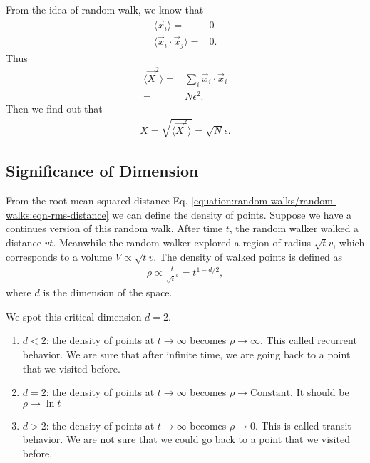 \documentclass[letterpaper,10pt,english]{sphinxmanual}
\begin{document}
From the idea of random walk, we know that
\begin{equation*}
\begin{split}\langle \vec x_i \rangle =& 0 \\
\langle \vec x_i \cdot \vec x_j \rangle =& 0.\end{split}
\end{equation*}
Thus
\begin{equation*}
\begin{split}\langle \vec X^2 \rangle = & \sum_i \vec x_i\cdot \vec x_i \\
=& N \epsilon^2.\end{split}
\end{equation*}
Then we find out that
\label{\detokenize{random-walks/random-walks:equation-eqn-rms-distance}}\begin{equation}\label{equation:random-walks/random-walks:eqn-rms-distance}
\begin{split}\bar X = \sqrt{\langle \vec X^2 \rangle} = \sqrt{N}\epsilon.\end{split}
\end{equation}

\subsection{Significance of Dimension}
\label{\detokenize{random-walks/random-walks:significance-of-dimension}}
From the root-mean-squared distance Eq. \eqref{equation:random-walks/random-walks:eqn-rms-distance} we can define the density of points. Suppose we have a continues version of this random walk. After time \(t\), the random walker walked a distance \(vt\). Meanwhile the random walker explored a region of radius \(\sqrt{t}v\), which corresponds to a volume \(V \propto \sqrt{t}v\). The density of walked points is defined as
\begin{equation*}
\begin{split}\rho \propto \frac{t}{\sqrt{t}^d} = t^{1-d/2},\end{split}
\end{equation*}
where \(d\) is the dimension of the space.

We spot this critical dimension \(d=2\).
\begin{enumerate}
\item {} 
\(d<2\): the density of points at \(t\to\infty\) becomes \(\rho\to \infty\). This called recurrent behavior. We are sure that after infinite time, we are going back to a point that we visited before.

\item {} 
\(d=2\): the density of points at \(t\to\infty\) becomes \(\rho\to \mathrm{Constant}\).  It should be \(\rho\to \ln t\)

\item {} 
\(d>2\): the density of points at \(t\to\infty\) becomes \(\rho\to 0\). This is called transit behavior. We are not sure that we could go back to a point that we visited before.

\end{enumerate}
\end{document}
